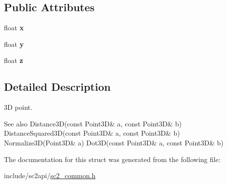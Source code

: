 \subsection*{Public Attributes}
\begin{DoxyCompactItemize}
\item 
\mbox{\label{structsc2_1_1_point3_d_accdd8069da18f58c8c277337a194772c}} 
float {\bfseries x}
\item 
\mbox{\label{structsc2_1_1_point3_d_ac76d6bd7e8a5f8ed1651c12dda1bda8f}} 
float {\bfseries y}
\item 
\mbox{\label{structsc2_1_1_point3_d_ac655c1e06c577584bb99d2c7cda936dc}} 
float {\bfseries z}
\end{DoxyCompactItemize}


\subsection{Detailed Description}
3D point. \begin{DoxySeeAlso}{See also}
Distance3\+D(const Point3\+D\& a, const Point3\+D\& b) Distance\+Squared3\+D(const Point3\+D\& a, const Point3\+D\& b) Normalize3\+D(\+Point3\+D\& a) Dot3\+D(const Point3\+D\& a, const Point3\+D\& b) 
\end{DoxySeeAlso}


The documentation for this struct was generated from the following file\+:\begin{DoxyCompactItemize}
\item 
include/sc2api/\hyperlink{sc2__common_8h}{sc2\+\_\+common.\+h}\end{DoxyCompactItemize}
